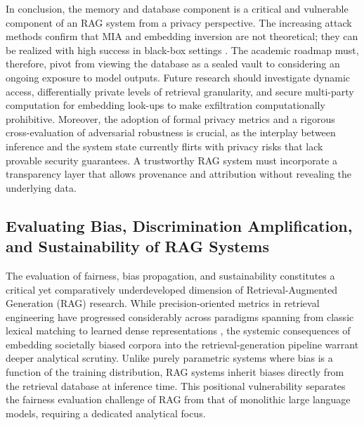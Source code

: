 \documentclass[11pt,a4paper]{article}
\begin{document}
In conclusion, the memory and database component is a critical and vulnerable component of an RAG system from a privacy perspective. The increasing attack methods confirm that MIA and embedding inversion are not theoretical; they can be realized with high success in black-box settings \cite{arxiv:2406.19234v1,arxiv:2005.11401v4}. The academic roadmap must, therefore, pivot from viewing the database as a sealed vault to considering an ongoing exposure to model outputs. Future research should investigate dynamic access, differentially private levels of retrieval granularity, and secure multi-party computation for embedding look-ups to make exfiltration computationally prohibitive. Moreover, the adoption of formal privacy metrics and a rigorous cross-evaluation of adversarial robustness is crucial, as the interplay between inference and the system state currently flirts with privacy risks that lack provable security guarantees. A trustworthy RAG system must incorporate a transparency layer that allows provenance and attribution without revealing the underlying data.


\subsection{Evaluating Bias, Discrimination Amplification, and Sustainability of RAG Systems}


The evaluation of fairness, bias propagation, and sustainability constitutes a critical yet comparatively underdeveloped dimension of Retrieval-Augmented Generation (RAG) research. While precision-oriented metrics in retrieval engineering have progressed considerably across paradigms spanning from classic lexical matching to learned dense representations \cite{arxiv:2211.14876v1,arxiv:2002.03932v1}, the systemic consequences of embedding societally biased corpora into the retrieval-generation pipeline warrant deeper analytical scrutiny. Unlike purely parametric systems where bias is a function of the training distribution, RAG systems inherit biases directly from the retrieval database at inference time. This positional vulnerability separates the fairness evaluation challenge of RAG from that of monolithic large language models, requiring a dedicated analytical focus.
\end{document}
